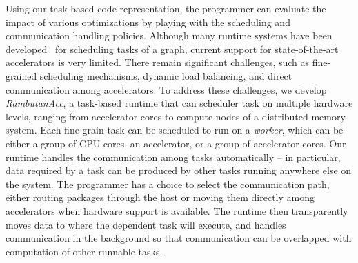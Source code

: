 Using our task-based code representation, the programmer can evaluate the impact of various optimizations by playing with the scheduling and communication handling policies.
Although many runtime systems have been developed~\cite{legion,physics,mpiacc,mvapich2gpu} for scheduling tasks of a graph, current support for state-of-the-art accelerators is very limited.
There remain significant challenges, such as fine-grained scheduling mechanisms, dynamic load balancing, and direct communication among accelerators.
To address these challenges, we develop {\em RambutanAcc}, a task-based runtime that can scheduler task on multiple hardware levels, ranging from accelerator cores to compute nodes of a distributed-memory system.
Each fine-grain task can be scheduled to run on a {\em worker}, which can be either a group of CPU cores, an accelerator, or a group of accelerator cores.
Our runtime handles the communication among tasks automatically -- in particular, data required by a task can be produced by other tasks running anywhere else on the system.
The programmer has a choice to select the communication path, either routing packages through the host or moving them directly among accelerators when hardware support is available.
The runtime then transparently moves data to where the dependent task will execute, and handles communication in the background so that communication can be overlapped with computation of other runnable tasks.


